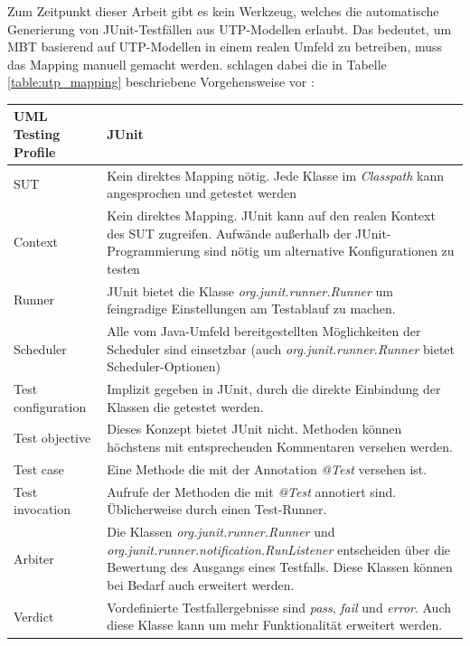 Zum Zeitpunkt dieser Arbeit gibt es kein Werkzeug, welches die automatische Generierung von JUnit-Testfällen aus \Gls{UTP}-Modellen erlaubt. Das bedeutet, um \Gls{MBT} basierend auf \Gls{UTP}-Modellen in einem realen Umfeld zu betreiben, muss das Mapping manuell gemacht werden. \citeauthor{_model-driven_2007} schlagen dabei die in Tabelle \ref{table:utp_mapping} beschriebene Vorgehensweise vor \cite{_model-driven_2007}:

\begin{table}[h]
\centering
\begin{tabular}
{ | l |p{9cm}|} \hline
\textbf{UML Testing Profile} & \textbf{JUnit} \\ \hline \Gls{SUT}                       & Kein direktes Mapping nötig. Jede Klasse im \textit{Classpath} kann angesprochen und getestet werden   \\ \hline
Context                   & Kein direktes Mapping. JUnit kann auf den realen Kontext des \Gls{SUT} zugreifen. Aufwände außerhalb der JUnit-Programmierung sind nötig um alternative Konfigurationen zu testen \\ \hline
Runner         			  & JUnit bietet die Klasse \textit{org.junit.runner.Runner} um feingradige Einstellungen am Testablauf zu machen. \\ \hline
Scheduler   & Alle vom Java-Umfeld bereitgestellten Möglichkeiten der Scheduler sind einsetzbar (auch \textit{org.junit.runner.Runner} bietet Scheduler-Optionen) \\ \hline
Test configuration        & Implizit gegeben in JUnit, durch die direkte Einbindung der Klassen die getestet werden. \\ \hline
Test objective            & Dieses Konzept bietet JUnit nicht. Methoden können höchstens mit entsprechenden Kommentaren versehen werden.\\ \hline
Test case                 & Eine Methode die mit der Annotation \textit{@Test} versehen ist. \\ \hline
Test invocation           & Aufrufe der Methoden die mit \textit{@Test} annotiert sind. Üblicherweise durch einen Test-Runner. \\ \hline
Arbiter                   & Die Klassen \textit{org.junit.runner.Runner} und \textit{org.junit.runner.notification.RunListener} entscheiden über die Bewertung des Ausgangs eines Testfalls. Diese Klassen können bei Bedarf auch erweitert werden. \\ \hline
Verdict                   & Vordefinierte Testfallergebnisse sind \textit{pass}, \textit{fail} und \textit{error}. Auch diese Klasse kann um mehr Funktionalität erweitert werden. \\ \hline

\end{tabular}
\end{table}
